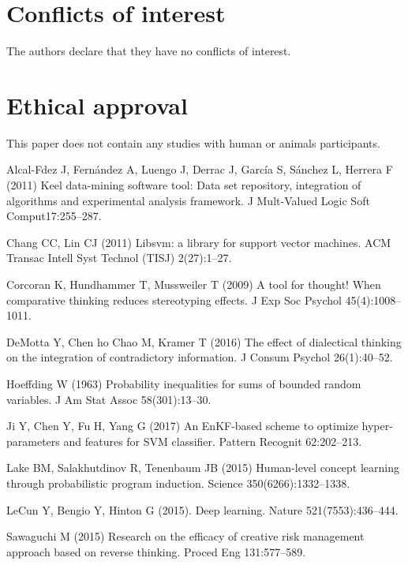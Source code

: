 \section*{Conflicts of interest}
The authors declare that they have no conflicts of interest.

\section*{Ethical approval}
This paper does not contain any studies with human  or animals participants.


\begin{thebibliography}{}
%
%

Alcal-Fdez J, Fernández A, Luengo J, Derrac J, García S, Sánchez L, Herrera F (2011) Keel data-mining software tool: Data set repository, integration of algorithms and experimental analysis framework. J Mult-Valued Logic Soft Comput17:255--287.

Chang CC, Lin CJ (2011) Libsvm: a library for support vector machines. ACM Transac Intell Syst Technol (TISJ) 2(27):1--27.

Corcoran K, Hundhammer T, Mussweiler T (2009) A tool for thought! When comparative thinking reduces stereotyping effects. J Exp Soc Psychol 45(4):1008--1011.

DeMotta Y, Chen ho Chao M, Kramer T (2016) The effect of dialectical thinking on the integration of contradictory information. J Consum Psychol 26(1):40--52.

Hoeffding W (1963) Probability inequalities for sums of bounded random variables. J Am Stat Assoc 58(301):13--30.

Ji Y, Chen Y, Fu H, Yang G (2017) An EnKF-based scheme to optimize hyper-parameters and features for SVM classifier. Pattern Recognit 62:202--213.

Lake BM, Salakhutdinov R, Tenenbaum JB (2015) Human-level concept learning through probabilistic program induction. Science 350(6266):1332--1338.

LeCun Y, Bengio Y, Hinton G (2015). Deep learning. Nature 521(7553):436--444.

Sawaguchi M (2015) Research on the efficacy of creative risk management approach based on reverse thinking. Proced Eng 131:577--589.


\end{thebibliography}
